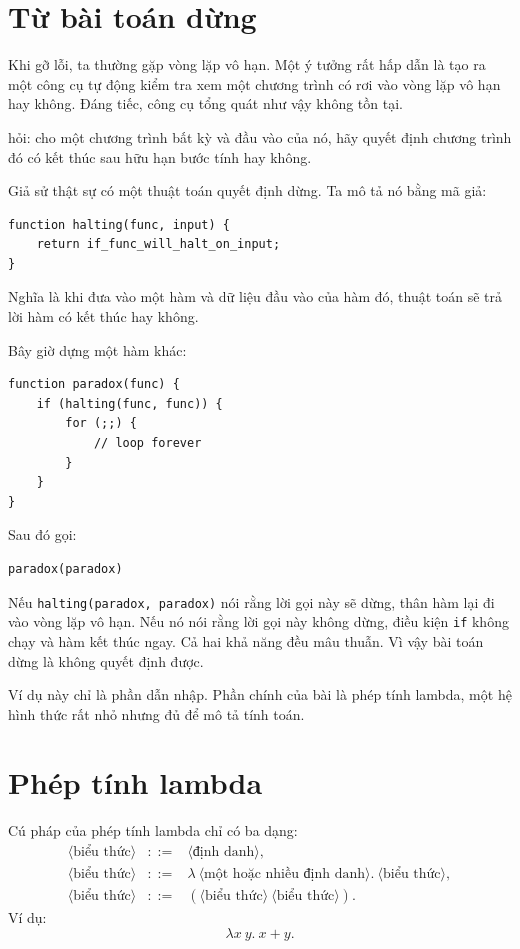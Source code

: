 \documentclass[11pt]{article}
\newcommand{\defeq}{\mathrel{::=}}
\begin{document}
\section{Từ bài toán dừng}

Khi gỡ lỗi, ta thường gặp vòng lặp vô hạn. Một ý tưởng rất hấp dẫn là tạo ra
một công cụ tự động kiểm tra xem một chương trình có rơi vào vòng lặp vô hạn
hay không. Đáng tiếc, công cụ tổng quát như vậy không tồn tại.

 hỏi: cho một chương trình bất kỳ và đầu vào của nó, hãy
quyết định chương trình đó có kết thúc sau hữu hạn bước tính hay không.

Giả sử thật sự có một thuật toán quyết định dừng. Ta mô tả nó bằng mã giả:
\begin{verbatim}
function halting(func, input) {
    return if_func_will_halt_on_input;
}
\end{verbatim}
Nghĩa là khi đưa vào một hàm và dữ liệu đầu vào của hàm đó, thuật toán sẽ trả
lời hàm có kết thúc hay không.

Bây giờ dựng một hàm khác:
\begin{verbatim}
function paradox(func) {
    if (halting(func, func)) {
        for (;;) {
            // loop forever
        }
    }
}
\end{verbatim}
Sau đó gọi:
\begin{verbatim}
paradox(paradox)
\end{verbatim}
Nếu \texttt{halting(paradox, paradox)} nói rằng lời gọi này sẽ dừng, thân hàm
lại đi vào vòng lặp vô hạn. Nếu nó nói rằng lời gọi này không dừng, điều kiện
\texttt{if} không chạy và hàm kết thúc ngay. Cả hai khả năng đều mâu thuẫn.
Vì vậy bài toán dừng là không quyết định được.

Ví dụ này chỉ là phần dẫn nhập. Phần chính của bài là phép tính lambda, một
hệ hình thức rất nhỏ nhưng đủ để mô tả tính toán.

\section{Phép tính lambda}

Cú pháp của phép tính lambda chỉ có ba dạng:
\[
\begin{array}{rcl}
\langle\text{biểu thức}\rangle &\defeq& \langle\text{định danh}\rangle,\\
\langle\text{biểu thức}\rangle &\defeq&
  \lambda\ \langle\text{một hoặc nhiều định danh}\rangle.\ 
  \langle\text{biểu thức}\rangle,\\
\langle\text{biểu thức}\rangle &\defeq&
  (\langle\text{biểu thức}\rangle\ \langle\text{biểu thức}\rangle).
\end{array}
\]
Ví dụ:
\[
  \lambda x\ y.\ x+y.
\]
\end{document}
